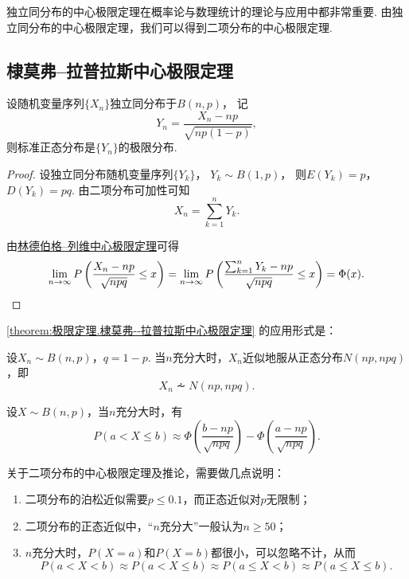 独立同分布的中心极限定理在概率论与数理统计的理论与应用中都非常重要.
由独立同分布的中心极限定理，我们可以得到二项分布的中心极限定理.
\subsection{棣莫弗--拉普拉斯中心极限定理}
\begin{theorem}\label{theorem:极限定理.棣莫弗--拉普拉斯中心极限定理}
设随机变量序列\(\{X_n\}\)独立同分布于\(B(n,p)\)，
记\[
	Y_n = \frac{X_n - np}{\sqrt{np(1-p)}},
\]
则标准正态分布是\(\{Y_n\}\)的极限分布.
\begin{proof}
设独立同分布随机变量序列\(\{Y_k\}\)，
\(Y_k \sim B(1,p)\)，
则\(E(Y_k)=p\)，
\(D(Y_k)=pq\).
由二项分布可加性可知\[
	X_n = \sum_{k=1}^n Y_k.
\]

由\hyperref[theorem:极限定理.林德伯格--列维中心极限定理]{林德伯格--列维中心极限定理}可得\[
	\lim_{n\to\infty} P\left(\frac{X_n-np}{\sqrt{npq}} \leq x\right)
	= \lim_{n\to\infty} P\left(\frac{\sum_{k=1}^n{Y_k}-np}{\sqrt{npq}} \leq x\right)
	= \Phi(x).
	\qedhere
\]
\end{proof}
\end{theorem}

\cref{theorem:极限定理.棣莫弗--拉普拉斯中心极限定理} 的应用形式是：
\begin{corollary}
设\(X_n \sim B(n,p)\)，\(q = 1-p\).
当\(n\)充分大时，\(X_n\)近似地服从正态分布\(N(np,npq)\)，即\[
X_n \dotsim N(np,npq).
\]
\end{corollary}

\begin{corollary}
设\(X \sim B(n,p)\)，当\(n\)充分大时，有\[
P(a < X \leq b)
\approx \Phi\left(\frac{b-np}{\sqrt{npq}}\right) - \Phi\left(\frac{a-np}{\sqrt{npq}}\right).
\]
\end{corollary}

关于二项分布的中心极限定理及推论，需要做几点说明：
\begin{enumerate}
\item 二项分布的泊松近似需要\(p \leq 0.1\)，而正态近似对\(p\)无限制；
\item 二项分布的正态近似中，“\(n\)充分大”一般认为\(n \geq 50\)；
\item \(n\)充分大时，\(P(X=a)\)和\(P(X=b)\)都很小，可以忽略不计，从而\[
P(a < X < b)
\approx P(a < X \leq b)
\approx P(a \leq X < b)
\approx P(a \leq X \leq b).
\]
\end{enumerate}

